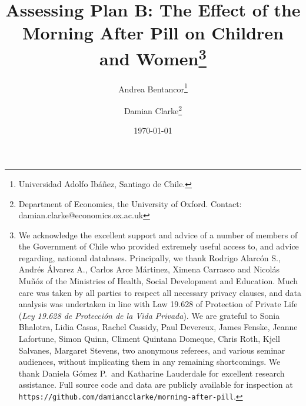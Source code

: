 \documentclass{article}[11pt,subeqn]
\title{Assessing Plan B: The Effect of the Morning After Pill on Children and 
Women\footnote{We acknowledge the excellent support and advice of a number of 
members of the Government of Chile who provided extremely useful access to, and 
advice regarding, national databases.  Principally, we thank Rodrigo Alarc\'on S., 
Andr\'es \'Alvarez A., Carlos Arce M\'artinez, Ximena Carrasco and Nicol\'as 
Mu\~n\'oz of the Ministries of Health, Social Development and Education.  Much 
care was taken by all parties to respect all necessary privacy clauses, and data 
analysis was undertaken in line with Law 19.628 of Protection of Private Life 
(\emph{Ley 19.628 de Protecci\'on de la Vida Privada}).  We are grateful to Sonia 
Bhalotra, Lidia Casas, Rachel Cassidy, Paul Devereux, James Fenske, Jeanne 
Lafortune, Simon Quinn, Climent Quintana Domeque, Chris Roth, Kjell Salvanes, 
Margaret Stevens, two anonymous referees, and various seminar audiences, without 
implicating them in any remaining shortcomings. We thank Daniela G\'omez P.\ 
and Katharine Lauderdale for excellent research assistance. Full source code and 
data are publicly available for inspection at 
\texttt{https://github.com/damiancclarke/morning-after-pill}.}}
\author{Andrea Bentancor\thanks{Universidad Adolfo Ib\'a\~nez, Santiago de Chile.} 
\and Damian Clarke\thanks{Department of Economics, the University of Oxford.  
Contact: damian.clarke@economics.ox.ac.uk}}
\date{\today}
\begin{document}
\begin{spacing}{1.4}
\maketitle



\end{spacing}
\end{document}
